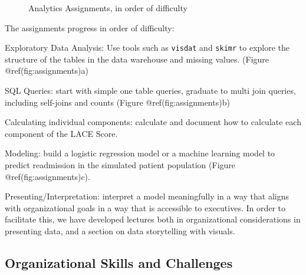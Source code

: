 \begin{Schunk}
\begin{figure}

{\centering {}\newline{}

}

\caption[Analytics Assignments, in order of difficulty]{Analytics Assignments, in order of difficulty}\label{fig:assignments}
\end{figure}
\end{Schunk}

The assignments progress in order of difficulty:

Exploratory Data Analysis: Use tools such as \texttt{visdat} and
\texttt{skimr} to explore the structure of the tables in the data
warehouse and missing values. (Figure @ref(fig:assignments)a)

SQL Queries: start with simple one table queries, graduate to multi join
queries, including self-joins and counts (Figure @ref(fig:assignments)b)

Calculating individual components: calculate and document how to
calculate each component of the LACE Score.

Modeling: build a logistic regression model or a machine learning model
to predict readmission in the simulated patient population (Figure
@ref(fig:assignments)c).

Presenting/Interpretation: interpret a model meaningfully in a way that
aligns with organizational goals in a way that is accessible to
executives. In order to facilitate this, we have developed lectures both
in organizational considerations in presenting data, and a section on
data storytelling with visuals.

\hypertarget{organizational-skills-and-challenges}{%
\subsection{Organizational Skills and
Challenges}\label{organizational-skills-and-challenges}}

